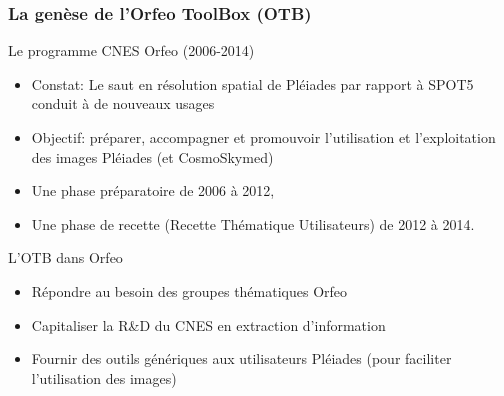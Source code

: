 \documentclass[8pt]{beamer}
\begin{document}
\begin{frame}
\frametitle{La genèse de l'Orfeo ToolBox (OTB)}

\begin{block}{Le programme CNES Orfeo  (2006-2014)}
\begin{itemize}
\item Constat: Le saut en résolution spatial de Pléiades par rapport à SPOT5 conduit à de nouveaux usages
\item Objectif: préparer, accompagner et promouvoir l'utilisation et l'exploitation des images Pléiades (et CosmoSkymed)
\item Une phase préparatoire de 2006 à 2012,
\item Une phase de recette (Recette Thématique Utilisateurs) de 2012 à 2014.
\end{itemize}
\end{block}

\begin{block}{L'OTB dans Orfeo}
\begin{itemize}
\item Répondre au besoin des groupes thématiques Orfeo
\item Capitaliser la R\&D du CNES en extraction d'information
\item Fournir des outils génériques aux utilisateurs Pléiades (pour faciliter l'utilisation des images)
\end{itemize}
\end{block}
\end{frame}
\end{document}

